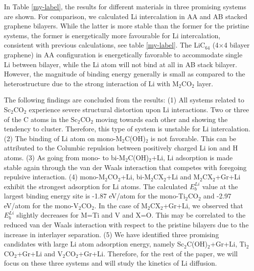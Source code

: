 In Table \ref{my-label}, the results for different materials in three promising systems are shown. For comparison, we calculated Li intercalation in AA and AB stacked graphene bilayers. While the latter is more stable than the former for the pristine systems, the former is energetically more favourable for Li intercalation, consistent with previous calculations\cite{PhysRevB.93.245438}, see table \ref{my-label}.  The LiC$_{64}$ (4$\times$4 bilayer graphene) in AA configuration is energetically favorable to accommodate single Li between bilayer, while the Li atom will not bind at all in AB stack bilayer. However, the magnitude of binding energy generally is small as compared to the heterostructure due to the strong interaction of Li with M$_2$CO$_2$ layer.


The following findings are concluded from the results: 
(1) All systems related to Sc$_2$CO$_2$ experience severe structural distortion upon Li interactions. Two or three of the C atoms in the Sc$_2$CO$_2$ moving towards each other and showing the tendency to cluster. Therefore, this type of system is unstable for Li intercalation. 
(2) The binding of Li atom on mono-M$_2$C(OH)$_2$ is not favorable. This can be attributed to the Columbic repulsion between positively charged Li ion and H atoms. 
(3) As going from mono- to bi-M$_2$C(OH)$_2$+Li, Li adsorption is made stable again through the van der Waals interaction that competes with foregoing repulsive interaction.  
(4) mono-M$_2$CO$_2$+Li,  bi-M$_2$CX$_2$+Li and M$_2$CX$_2$+Gr+Li exhibit the strongest adsorption for Li atoms. The calculated $E_{b}^{Li}$ value at the largest binding energy site is -1.87 eV/atom for the mono-Ti$_2$CO$_2$ and -2.97 eV/atom for the mono-V$_2$CO$_2$. In the case of M$_2$CX$_2$+Gr+Li, we observed that $E_{b}^{Li}$ slightly decreases for M=Ti and V and X=O.  This may be correlated to the reduced van der Waals interaction with respect to the pristine bilayers due to the increase in interlayer separation.  
(5) We have identified three promising candidates with large Li atom adsorption energy, namely Sc$_2$C(OH)$_2$+Gr+Li, Ti$_2$CO$_2$+Gr+Li and V$_2$CO$_2$+Gr+Li. Therefore, for the rest of the paper, we will focus on these three systems and will study the kinetics of Li diffusion. 

